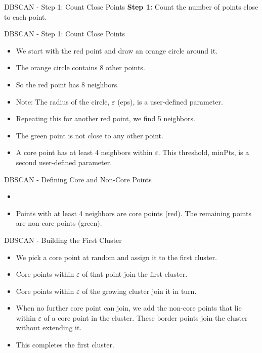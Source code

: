 \documentclass[aspectratio=169,xcolor=dvipsnames,svgnames,x11names,fleqn]{beamer}
\begin{document}
\begin{frame}{DBSCAN - Step 1: Count Close Points}
    \textbf{Step 1:} Count the number of points close to each point.
\vfill
\end{frame}

\begin{frame}{DBSCAN - Step 1: Count Close Points}
    \begin{itemize}
    \item We start with the red point and draw an orange circle around it.
  \item The orange circle contains 8 other points.
\item So the red point has 8 neighbors.
\item Note: The radius of the circle, $\varepsilon$ (eps), is a user-defined parameter.
\item Repeating this for another red point, we find 5 neighbors.
\item  The green point is not close to any other point.
\item A core point has at least 4 neighbors within $\varepsilon$. This threshold, minPts, is a second user-defined parameter.
\end{itemize}
\begin{center}
\end{center}
\end{frame}

\begin{frame}{DBSCAN - Defining Core and Non-Core Points}
    \begin{itemize}
    \item \item Points with at least 4 neighbors are core points (red). The remaining points are non-core points (green).
\end{itemize}
\vfill
\end{frame}

\begin{frame}{}
\end{frame}


\begin{frame}{DBSCAN - Building the First Cluster}
    \begin{itemize}
\item We pick a core point at random and assign it to the first cluster.
\item Core points within $\varepsilon$ of that point join the first cluster.
\item Core points within $\varepsilon$ of the growing cluster join it in turn.
\item When no further core point can join, we add the non-core points that lie within $\varepsilon$ of a core point in the cluster. These border points join the cluster without extending it.
\item This completes the first cluster.
\end{itemize}
\end{frame}
\end{document}
